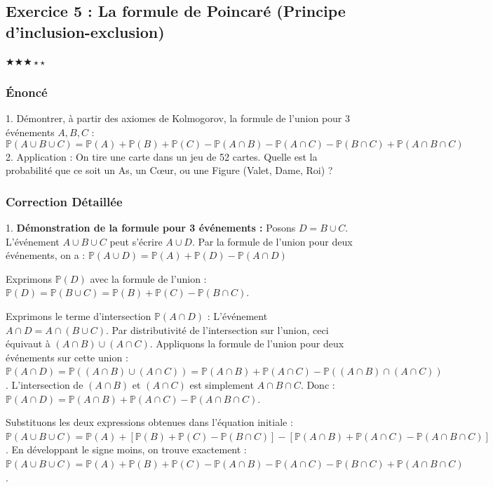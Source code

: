 \documentclass[11pt,a4paper]{article}
\begin{document}
\subsection*{Exercice 5 : La formule de Poincaré (Principe d'inclusion-exclusion)}
$\bigstar\bigstar\bigstar\star\star$

\subsubsection*{Énoncé}

1. Démontrer, à partir des axiomes de Kolmogorov, la formule de l'union pour $3$ événements $A, B, C$ :
$$ \mathbb{P}(A \cup B \cup C) = \mathbb{P}(A) + \mathbb{P}(B) + \mathbb{P}(C) - \mathbb{P}(A \cap B) - \mathbb{P}(A \cap C) - \mathbb{P}(B \cap C) + \mathbb{P}(A \cap B \cap C) $$
2. Application : On tire une carte dans un jeu de 52 cartes. Quelle est la probabilité que ce soit un As, un Cœur, ou une Figure (Valet, Dame, Roi) ?


\subsubsection*{Correction Détaillée}

1. \textbf{Démonstration de la formule pour 3 événements :}
Posons $D = B \cup C$.
L'événement $A \cup B \cup C$ peut s'écrire $A \cup D$.
Par la formule de l'union pour deux événements, on a :
$\mathbb{P}(A \cup D) = \mathbb{P}(A) + \mathbb{P}(D) - \mathbb{P}(A \cap D)$

Exprimons $\mathbb{P}(D)$ avec la formule de l'union :
$\mathbb{P}(D) = \mathbb{P}(B \cup C) = \mathbb{P}(B) + \mathbb{P}(C) - \mathbb{P}(B \cap C)$.

Exprimons le terme d'intersection $\mathbb{P}(A \cap D)$ :
L'événement $A \cap D = A \cap (B \cup C)$. Par distributivité de l'intersection sur l'union, ceci équivaut à $(A \cap B) \cup (A \cap C)$.
Appliquons la formule de l'union pour deux événements sur cette union :
$\mathbb{P}(A \cap D) = \mathbb{P}((A \cap B) \cup (A \cap C)) = \mathbb{P}(A \cap B) + \mathbb{P}(A \cap C) - \mathbb{P}((A \cap B) \cap (A \cap C))$.
L'intersection de $(A \cap B)$ et $(A \cap C)$ est simplement $A \cap B \cap C$.
Donc :
$\mathbb{P}(A \cap D) = \mathbb{P}(A \cap B) + \mathbb{P}(A \cap C) - \mathbb{P}(A \cap B \cap C)$.

Substituons les deux expressions obtenues dans l'équation initiale :
$\mathbb{P}(A \cup B \cup C) = \mathbb{P}(A) + \left[ \mathbb{P}(B) + \mathbb{P}(C) - \mathbb{P}(B \cap C) \right] - \left[ \mathbb{P}(A \cap B) + \mathbb{P}(A \cap C) - \mathbb{P}(A \cap B \cap C) \right]$.
En développant le signe moins, on trouve exactement :
$\mathbb{P}(A \cup B \cup C) = \mathbb{P}(A) + \mathbb{P}(B) + \mathbb{P}(C) - \mathbb{P}(A \cap B) - \mathbb{P}(A \cap C) - \mathbb{P}(B \cap C) + \mathbb{P}(A \cap B \cap C)$.
\end{document}
